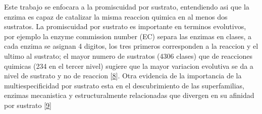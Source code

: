 \documentclass[12pt,twoside]{reedthesis}
\begin{document}
  Este trabajo se enfocara a la promiscuidad por sustrato, entendiendo asi
  que la enzima es capaz de catalizar la misma reaccion quimica en al
  menos dos sustratos. La promiscuidad por sustrato es importante en
  terminos evolutivos, por ejemplo la enzyme commission number (EC) separa
  las enzimas en clases, a cada enzima se asignan 4 digitos, los tres
  primeros corresponden a la reaccion y el ultimo al sustrato; el mayor
  numero de sustratos (4306 clases) que de reacciones quimicas (234 en el
  tercer nivel) sugiere que la mayor variacion evolutiva se da a nivel de
  sustrato y no de reaccion
  {[}\protect\hyperlink{ref-li_computational_2004}{8}{]}. Otra evidencia
  de la importancia de la multiespecificidad por sustrato esta en el
  descubrimiento de las superfamilias, enzimas mecanistica y
  estructuralmente relacionadas que divergen en su afinidad por sustrato
  {[}\protect\hyperlink{ref-glasner_evolution_2006}{9}{]}
  
\end{document}
